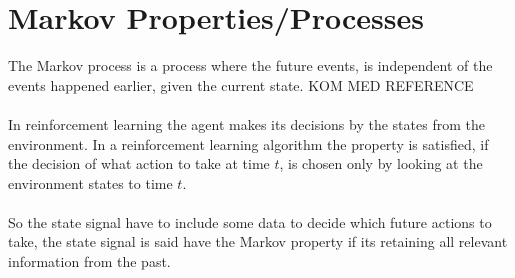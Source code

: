 \documentclass[11pt]{article}
\begin{document}
\maketitle

\section{Markov Properties/Processes}

The Markov process is a process where the future events, is independent of the events happened earlier, given the current state. KOM MED REFERENCE
\\ \\
In reinforcement learning the agent makes its decisions by the states from the environment. In a reinforcement learning algorithm the property is satisfied, if the decision of what action to take at time $t$, is chosen only by looking at the environment states to time $t$.
\\ \\
So the state signal have to include some data to decide which future actions to take, the state signal is said have the Markov property if its retaining all relevant information from the past.
\end{document}

